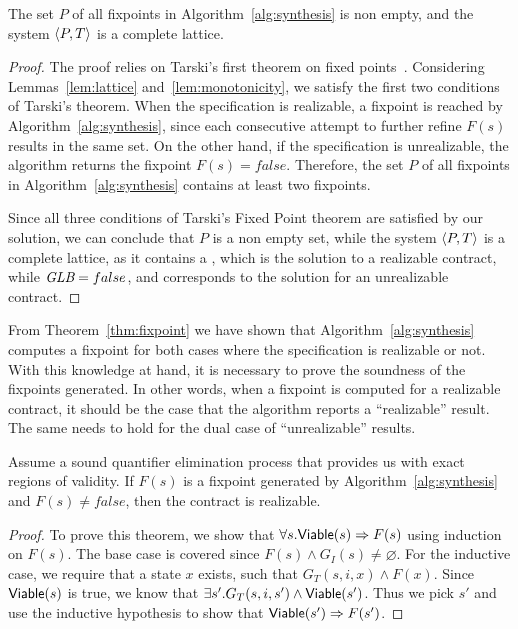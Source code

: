 \begin{theorem}
The set $P$ of all fixpoints in Algorithm~\ref{alg:synthesis} is non
empty, and the system $\langle P, T \rangle$ is a complete lattice.
\label{thm:fixpoint}
\end{theorem}
\begin{proof}
The proof relies on Tarski's first theorem on fixed
points~\cite{tarski1955lattice}.
Considering Lemmas~\ref{lem:lattice} and~\ref{lem:monotonicity}, we satisfy the first two
conditions of Tarski's theorem. When the specification is realizable, a
fixpoint is reached by Algorithm~\ref{alg:synthesis}, since each consecutive
attempt to further refine $F(s)$ results in the same set. On the other hand, if
the specification is unrealizable, the algorithm returns the fixpoint $F(s) = false$. Therefore, the
set $P$ of all fixpoints in Algorithm~\ref{alg:synthesis} contains at least two
fixpoints.

Since all three conditions of Tarski's Fixed Point theorem are satisfied by our
solution, we can conclude that $P$ is a non empty set, while the system
$\langle P, T \rangle$ is a complete lattice, as it contains a \lub, which is
the solution to a realizable contract, while $\textit {GLB} = false$, and corresponds to
the solution for an unrealizable contract.
\end{proof}

From Theorem~\ref{thm:fixpoint} we have shown that Algorithm~\ref{alg:synthesis} computes a fixpoint for both cases where the specification is realizable or not. With this knowledge at hand, it is necessary to prove the soundness of the fixpoints generated. In other words, when a fixpoint is computed for a realizable contract, it should be the case that the algorithm reports a ``realizable'' result. The same needs to hold for the dual case of ``unrealizable'' results.

\begin{theorem}
\label{thm:sndreal}

Assume a sound quantifier elimination process that provides us with exact regions of validity. If $F(s)$ is a fixpoint generated by Algorithm~\ref{alg:synthesis} and $F(s) \neq false$, then the contract is realizable.
\end{theorem}
\begin{proof} To prove this theorem, we show that $\forall s. {\mathsf {Viable}}(s) \Rightarrow F(s)$ using induction on $F(s)$. The base case is covered since $F(s) \land G_I(s) \neq \varnothing$. For the inductive case, we require that a state $x$ exists, such that $G_T(s,i,x) \land F(x)$. Since ${\mathsf {Viable}}(s)$ is true, we know that $\exists s'. G_T(s,i,s') \land {\mathsf {Viable}}(s')$. Thus we pick $s'$ and use the inductive hypothesis to show that ${\mathsf {Viable}}(s') \Rightarrow F(s')$.
\end{proof}

